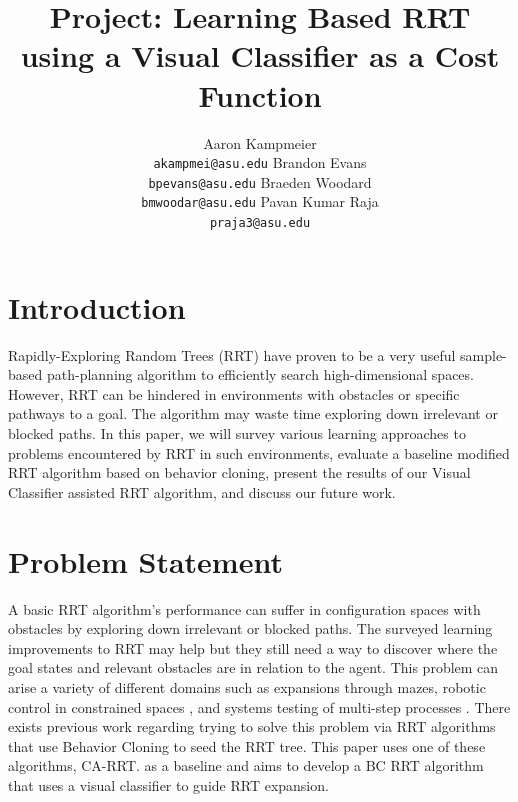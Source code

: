 \documentclass{article}
\title{Project: Learning Based RRT using a Visual Classifier as a Cost Function}
\author{Aaron Kampmeier \\ \texttt{akampmei@asu.edu} \And Brandon Evans \\ \texttt{bpevans@asu.edu} \And Braeden Woodard \\ \texttt{bmwoodar@asu.edu} \And Pavan Kumar Raja \\ \texttt{praja3@asu.edu}}
\begin{document}


\maketitle


\section{Introduction}

Rapidly-Exploring Random Trees (RRT) \cite{Steven} have proven to be a very useful sample-based path-planning algorithm to efficiently search high-dimensional spaces. However, RRT can be hindered in environments with obstacles or specific pathways to a goal. The algorithm may waste time exploring down irrelevant or blocked paths. In this paper, we will survey various learning approaches to problems encountered by RRT in such environments, evaluate a baseline modified RRT algorithm based on behavior cloning, present the results of our Visual Classifier assisted RRT algorithm, and discuss our future work. 

\section{Problem Statement}

A basic RRT algorithm's performance can suffer in configuration spaces with obstacles by exploring down irrelevant or blocked paths. The surveyed learning improvements to RRT may help but they still need a way to discover where the goal states and relevant obstacles are in relation to the agent. This problem can arise a variety of different domains such as expansions through mazes, robotic control in constrained spaces \cite{9164659}, and systems testing of multi-step processes \cite{Zuo}. There exists previous work regarding trying to solve this problem via RRT algorithms that use Behavior Cloning to seed the RRT tree. This paper uses one of these algorithms, CA-RRT\cite{Zuo}. as a baseline and aims to develop a BC RRT algorithm that uses a visual classifier to guide RRT expansion.
\end{document}
